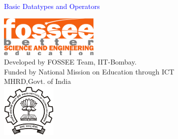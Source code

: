 \documentclass[presentation]{beamer}
\title{}
\author{FOSSEE}
\date{2010-09-14 Tue}
\begin{document}
\begin{frame}

\begin{center}
\vspace{12pt}
\textcolor{blue}{\huge Basic Datatypes and Operators}
\end{center}
\vspace{18pt}
\begin{center}
\vspace{10pt}
\includegraphics[scale=0.95]{../images/fossee-logo.png}\\
\vspace{5pt}
\scriptsize Developed by FOSSEE Team, IIT-Bombay. \\ 
\scriptsize Funded by National Mission on Education through ICT\\
\scriptsize  MHRD,Govt. of India\\
\includegraphics[scale=0.30]{../images/iitb-logo.png}\\
\end{center}
\end{frame}
\end{document}

